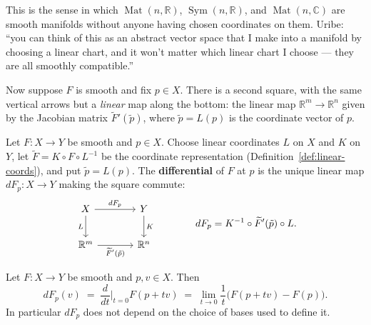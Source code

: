 \documentclass[11pt]{report}
\makeatletter
\newcounter{defcounter}[section]
\newcounter{thmcounter}[section]
\newcommand{\thmlabel}[1]{\edef\@currentlabel{\arabic{section}.\arabic{thmcounter}}\label{#1}}
\newcommand{\deflabel}[1]{\edef\@currentlabel{\arabic{section}.\arabic{defcounter}}\label{#1}}
\DeclareMathOperator{\Mat}{Mat}
\DeclareMathOperator{\Sym}{Sym}
\newcommand{\leeref}[1]{\par\smallskip{\raggedleft\footnotesize\textsc{Lee}:\ #1\par}}
\makeatother
\begin{document}
\begin{rembox}\label{rem:vector-spaces-3}
This is the sense in which $\Mat(n,\mathbb{R})$, $\Sym(n,\mathbb{R})$, and $\Mat(n,\mathbb{C})$ are smooth manifolds without anyone having chosen coordinates on them. Uribe: ``you can think of this as an abstract vector space that I make into a manifold by choosing a linear chart, and it won't matter which linear chart I choose --- they are all smoothly compatible.''
\end{rembox}

Now suppose $F$ is smooth and fix $p \in X$. There is a second square, with the same vertical arrows but a \emph{linear} map along the bottom: the linear map $\mathbb{R}^m \to \mathbb{R}^n$ given by the Jacobian matrix $\widetilde F'(\tilde p)$, where $\tilde p = L(p)$ is the coordinate vector of $p$.

\begin{defbox}\deflabel{def:vs-differential}
Let $F : X \to Y$ be smooth and $p \in X$. Choose linear coordinates $L$ on $X$ and $K$ on $Y$, let $\widetilde F = K \circ F \circ L^{-1}$ be the coordinate representation (Definition~\ref{def:linear-coords}), and put $\tilde p = L(p)$. The \textbf{differential} of $F$ at $p$ is the unique linear map $dF_p : X \to Y$ making the square commute:
\[
\begin{tikzcd}[row sep=2.2em, column sep=3.6em]
X \arrow[r, "dF_p"] \arrow[d, "L"'] & Y \arrow[d, "K"] \\
\mathbb{R}^m \arrow[r, "\widetilde F'(\tilde p)"'] & \mathbb{R}^n
\end{tikzcd}
\qquad\qquad dF_p = K^{-1} \circ \widetilde F'(\tilde p) \circ L.
\]
\end{defbox}

\begin{thmbox}\thmlabel{thm:vs-differential-curves}
Let $F : X \to Y$ be smooth and $p, v \in X$. Then
\[
dF_p(v) \;=\; \frac{d}{dt}\Big|_{t=0} F(p + tv) \;=\; \lim_{t \to 0} \frac{1}{t}\big( F(p+tv) - F(p) \big).
\]
In particular $dF_p$ does not depend on the choice of bases used to define it.
\leeref{cf.\ Corollary 3.25}
\end{thmbox}
\end{document}
